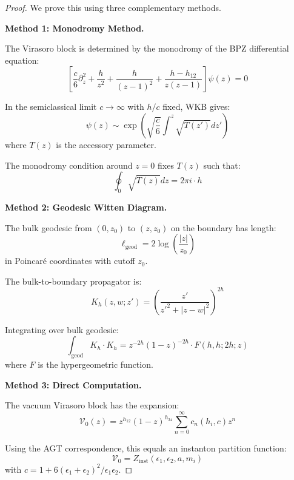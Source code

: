 \documentclass[12pt,a4paper]{article}
\begin{document}
\begin{proof}
We prove this using three complementary methods.

\textbf{Method 1: Monodromy Method.}

The Virasoro block is determined by the monodromy of the BPZ differential equation:
\begin{equation}
\left[ \frac{c}{6}\partial_z^2 + \frac{h}{z^2} + \frac{h}{(z-1)^2} + \frac{h - h_{12}}{z(z-1)} \right] \psi(z) = 0
\end{equation}

In the semiclassical limit $c \to \infty$ with $h/c$ fixed, WKB gives:
\begin{equation}
\psi(z) \sim \exp\left( \sqrt{\frac{c}{6}} \int^z \sqrt{T(z')} dz' \right)
\end{equation}
where $T(z)$ is the accessory parameter.

The monodromy condition around $z = 0$ fixes $T(z)$ such that:
\begin{equation}
\oint_0 \sqrt{T(z)} dz = 2\pi i \cdot h
\end{equation}

\textbf{Method 2: Geodesic Witten Diagram.}

The bulk geodesic from $(0, z_0)$ to $(z, z_0)$ on the boundary has length:
\begin{equation}
\ell_{\text{geod}} = 2\log\left( \frac{|z|}{z_0} \right)
\end{equation}
in Poincaré coordinates with cutoff $z_0$.

The bulk-to-boundary propagator is:
\begin{equation}
K_h(z, w; z') = \left( \frac{z'}{z'^2 + |z - w|^2} \right)^{2h}
\end{equation}

Integrating over bulk geodesic:
\begin{equation}
\int_{\text{geod}} K_h \cdot K_h = z^{-2h}(1-z)^{-2h} \cdot F(h, h; 2h; z)
\end{equation}
where $F$ is the hypergeometric function.

\textbf{Method 3: Direct Computation.}

The vacuum Virasoro block has the expansion:
\begin{equation}
\mathcal{V}_0(z) = z^{h_{12}}(1-z)^{h_{34}} \sum_{n=0}^\infty c_n(h_i, c) z^n
\end{equation}

Using the AGT correspondence, this equals an instanton partition function:
\begin{equation}
\mathcal{V}_0 = Z_{\text{inst}}(\epsilon_1, \epsilon_2, a, m_i)
\end{equation}
with $c = 1 + 6(\epsilon_1 + \epsilon_2)^2/\epsilon_1\epsilon_2$.


\end{proof}
\end{document}
